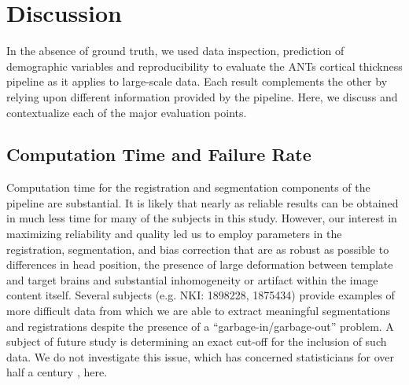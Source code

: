 \section{Discussion}
In the absence of ground truth, we used data inspection, prediction of
demographic variables and reproducibility to evaluate the ANTs
cortical thickness pipeline as it applies to large-scale data.  Each
result complements the other by relying upon different information
provided by the pipeline.  Here, we discuss and contextualize each of
the major evaluation points. 

\subsection{Computation Time and Failure Rate}
Computation time for the registration and segmentation components of
the pipeline are substantial.  It is likely that nearly as reliable
results can be obtained in much less time for many of the subjects in
this study.  However, our interest in
maximizing reliability and quality led us to employ parameters in the
registration, segmentation, and bias correction that are as robust as
possible to differences in head position, the presence of large
deformation between template and target brains and substantial
inhomogeneity or artifact within the image content itself.  Several
subjects (e.g. NKI: 1898228, 1875434)
provide examples of more difficult data from which we are able to
extract meaningful segmentations and registrations despite the presence of a
``garbage-in/garbage-out'' problem.  A subject of future study is
determining an exact cut-off for the inclusion of such data.  We do not
investigate this issue, which has concerned statisticians for over
half a century \cite{Hampel2001}, here. 

